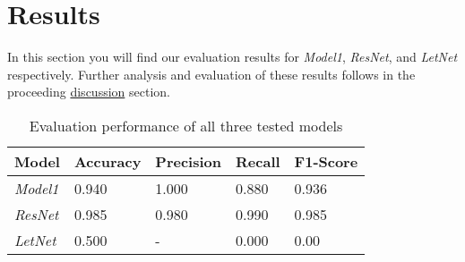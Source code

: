 \documentclass{article}
\begin{document}





\section{Results}

In this section you will find our evaluation results for \textit{Model1}, \textit{ResNet}, and \textit{LetNet} respectively. Further analysis and evaluation of these results follows in the proceeding \hyperref[sec:discussion]{discussion} section.



\begin{table}[h!]
  \caption{Evaluation performance of all three tested models}
  \label{sample-table}
  \centering
  \begin{tabular}{lllll}
    \toprule
    \cmidrule(r){1-2}
    Model  & Accuracy & Precision & Recall & F1-Score \\
    \midrule
\textit{Model1} & 0.940  & 1.000  & 0.880 & 0.936   \\
    \textit{ResNet} & 0.985  & 0.980  & 0.990 & 0.985   \\
    \textit{LetNet} & 0.500  & -      & 0.000 & 0.00   \\
    \bottomrule
  \end{tabular}
\end{table}
\end{document}
